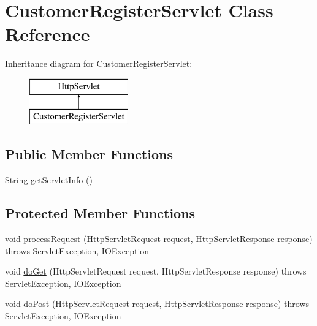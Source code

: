 \hypertarget{class_customer_register_servlet}{}\section{Customer\+Register\+Servlet Class Reference}
\label{class_customer_register_servlet}
Inheritance diagram for Customer\+Register\+Servlet\+:\begin{figure}[H]
\begin{center}
\leavevmode
\includegraphics[height=2.000000cm]{class_customer_register_servlet}
\end{center}
\end{figure}
\subsection*{Public Member Functions}
\begin{DoxyCompactItemize}
\item 
String \mbox{\hyperlink{class_customer_register_servlet_abe5627557f5da5d340e39f3409700b3e}{get\+Servlet\+Info}} ()
\end{DoxyCompactItemize}
\subsection*{Protected Member Functions}
\begin{DoxyCompactItemize}
\item 
void \mbox{\hyperlink{class_customer_register_servlet_a107ac767839a6faf83b5530c737e94e3}{process\+Request}} (Http\+Servlet\+Request request, Http\+Servlet\+Response response)  throws Servlet\+Exception, I\+O\+Exception 
\item 
void \mbox{\hyperlink{class_customer_register_servlet_a07b3e622f75a3b6e0138917342a965f6}{do\+Get}} (Http\+Servlet\+Request request, Http\+Servlet\+Response response)  throws Servlet\+Exception, I\+O\+Exception 
\item 
void \mbox{\hyperlink{class_customer_register_servlet_a73046b2af05ebce0606ff854c444c1cd}{do\+Post}} (Http\+Servlet\+Request request, Http\+Servlet\+Response response)  throws Servlet\+Exception, I\+O\+Exception 
\end{DoxyCompactItemize}


